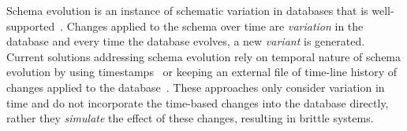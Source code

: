 Schema evolution is an instance of schematic variation in databases
that is well-supported~\cite{SchEvolRA90McKenzie, 
schVersioning97Castro, tempSchEvol91Ariav, tsql95Snodgrass, 
prima08Moon}.
Changes applied to the schema over time are \emph{variation} 
in the database and every time the database evolves, a new
\emph{variant} is generated.
Current solutions addressing schema
evolution rely on temporal nature of schema evolution by using
timestamps~\cite{SchEvolRA90McKenzie, schVersioning97Castro, 
tempSchEvol91Ariav, tsql95Snodgrass} 
or keeping an external file of time-line history of 
changes applied to the database~\cite{prima08Moon}. 
These approaches only consider variation in time and do not
incorporate the time-based changes into
the database directly, rather they \emph{simulate} the effect of these changes,
resulting in brittle systems.


